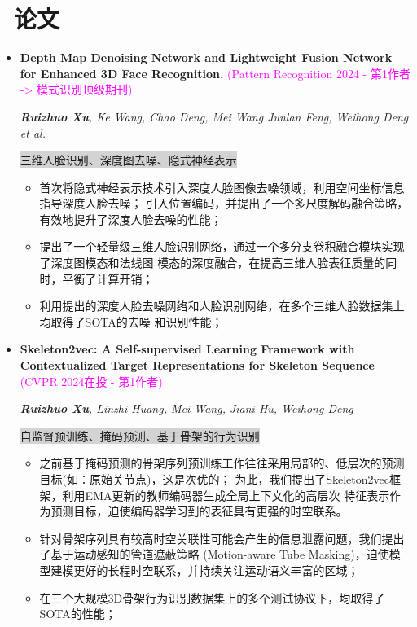 \documentclass{resume}
\begin{document}
\section{\faInfo\ 论文}
\begin{itemize}[parsep=0.5ex]
  \item \textbf{Depth Map Denoising Network and Lightweight Fusion Network for Enhanced 3D Face Recognition.}
        \textcolor{magenta}{(Pattern Recognition 2024 - 第1作者 -> 模式识别顶级期刊)}
        \href{https://www.sciencedirect.com/science/article/pii/S0031320323006349}{\textcolor{linkcolor}{\faExternalLink{}}}

        \textit{\textbf{Ruizhuo Xu}, Ke Wang, Chao Deng, Mei Wang Junlan Feng, Weihong Deng et al.}

        \colorbox{lightgray}{三维人脸识别、深度图去噪、隐式神经表示}

        \begin{itemize}[parsep=0.5ex]
          \item 首次将隐式神经表示技术引入深度人脸图像去噪领域，利用空间坐标信息指导深度人脸去噪；
                引入位置编码，并提出了一个多尺度解码融合策略，有效地提升了深度人脸去噪的性能；
          \item 提出了一个轻量级三维人脸识别网络，通过一个多分支卷积融合模块实现了深度图模态和法线图
                模态的深度融合，在提高三维人脸表征质量的同时，平衡了计算开销；
          \item 利用提出的深度人脸去噪网络和人脸识别网络，在多个三维人脸数据集上均取得了SOTA的去噪
                和识别性能；
        \end{itemize}
        
  \item \textbf{Skeleton2vec: A Self-supervised Learning Framework with Contextualized Target Representations for Skeleton Sequence}
        \textcolor{magenta}{(CVPR 2024在投 - 第1作者)}
        \href{https://arxiv.org/abs/2401.00921}{\textcolor{linkcolor}{\faExternalLink{}}}

        \textit{\textbf{Ruizhuo Xu}, Linzhi Huang, Mei Wang, Jiani Hu, Weihong Deng}

        \colorbox{lightgray}{自监督预训练、掩码预测、基于骨架的行为识别}

        \begin{itemize}[parsep=0.5ex]
          \item 之前基于掩码预测的骨架序列预训练工作往往采用局部的、低层次的预测目标(如：原始关节点)，这是次优的；
                为此，我们提出了Skeleton2vec框架，利用EMA更新的教师编码器生成全局上下文化的高层次
                特征表示作为预测目标，迫使编码器学习到的表征具有更强的时空联系。
          \item 针对骨架序列具有较高时空关联性可能会产生的信息泄露问题，我们提出了基于运动感知的管道遮蔽策略
                (Motion-aware Tube Masking)，迫使模型建模更好的长程时空联系，并持续关注运动语义丰富的区域；
          \item 在三个大规模3D骨架行为识别数据集上的多个测试协议下，均取得了SOTA的性能；
        \end{itemize}
        

\end{itemize}
\end{document}
